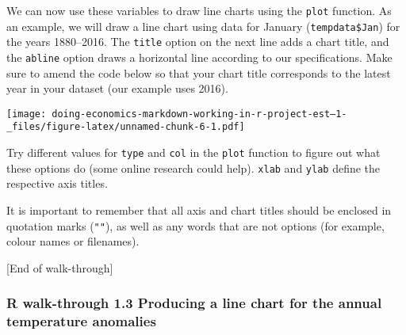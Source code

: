 \documentclass[
]{article}
\newenvironment{Shaded}{\begin{snugshade}}{\end{snugshade}}
\newcommand{\AttributeTok}[1]{\textcolor[rgb]{0.13,0.29,0.53}{#1}}
\newcommand{\CommentTok}[1]{\textcolor[rgb]{0.56,0.35,0.01}{\textit{#1}}}
\newcommand{\DecValTok}[1]{\textcolor[rgb]{0.00,0.00,0.81}{#1}}
\newcommand{\FloatTok}[1]{\textcolor[rgb]{0.00,0.00,0.81}{#1}}
\newcommand{\FunctionTok}[1]{\textcolor[rgb]{0.13,0.29,0.53}{\textbf{#1}}}
\newcommand{\NormalTok}[1]{#1}
\newcommand{\SpecialCharTok}[1]{\textcolor[rgb]{0.81,0.36,0.00}{\textbf{#1}}}
\newcommand{\StringTok}[1]{\textcolor[rgb]{0.31,0.60,0.02}{#1}}
\begin{document}
We can now use these variables to draw line charts using the
\texttt{plot} function. As an example, we will draw a line chart using
data for January (\texttt{tempdata\$Jan}) for the years 1880--2016. The
\texttt{title} option on the next line adds a chart title, and the
\texttt{abline} option draws a horizontal line according to our
specifications. Make sure to amend the code below so that your chart
title corresponds to the latest year in your dataset (our example uses
2016).

\begin{Shaded}
\end{Shaded}

\texttt{[image: doing-economics-markdown-working-in-r-project-est--1-\_files/figure-latex/unnamed-chunk-6-1.pdf]}

Try different values for \texttt{type} and \texttt{col} in the
\texttt{plot} function to figure out what these options do (some online
research could help). \texttt{xlab} and \texttt{ylab} define the
respective axis titles.

It is important to remember that all axis and chart titles should be
enclosed in quotation marks (\texttt{""}), as well as any words that are
not options (for example, colour names or filenames).

{[}End of walk-through{]}

\subsubsection{R walk-through 1.3 Producing a line chart for the annual
temperature
anomalies}\label{r-walk-through-1.3-producing-a-line-chart-for-the-annual-temperature-anomalies}
\end{document}
